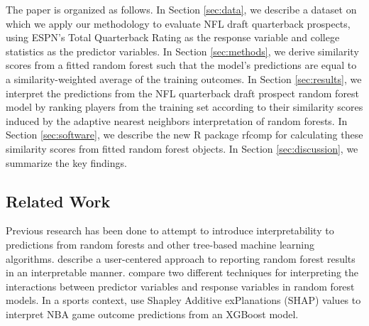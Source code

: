 \documentclass{article}
\begin{document}
The paper is organized as follows. In Section \ref{sec:data}, we describe a dataset on which we apply our methodology to evaluate NFL draft quarterback prospects, using ESPN's Total Quarterback Rating as the response variable and college statistics as the predictor variables. In Section \ref{sec:methods}, we derive similarity scores from a fitted random forest such that the model's predictions are equal to a similarity-weighted average of the training outcomes. In Section \ref{sec:results}, we interpret the predictions from the NFL quarterback draft prospect random forest model by ranking players from the training set according to their similarity scores induced by the adaptive nearest neighbors interpretation of random forests. In Section \ref{sec:software}, we describe the new R package rfcomp for calculating these similarity scores from fitted random forest objects. In Section \ref{sec:discussion}, we summarize the key findings.

\subsection{Related Work}

Previous research has been done to attempt to introduce interpretability to predictions from random forests and other tree-based machine learning algorithms. \textcite{petkovic_improving_2018} describe a user-centered approach to reporting random forest results in an interpretable manner. \textcite{aria_comparison_2021} compare two different techniques for interpreting the interactions between predictor variables and response variables in random forest models. In a sports context, \textcite{ouyang_integration_2024} use Shapley Additive exPlanations (SHAP) values to interpret NBA game outcome predictions from an XGBoost model.
\end{document}
